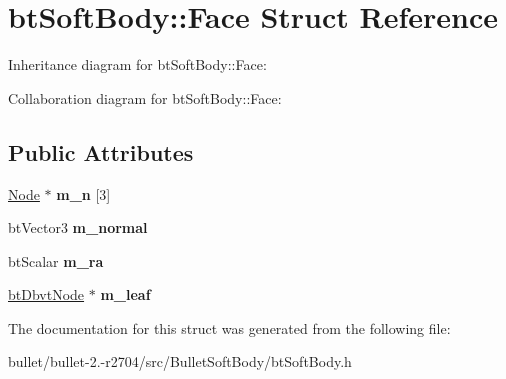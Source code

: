 \hypertarget{structbt_soft_body_1_1_face}{\section{bt\+Soft\+Body\+:\+:Face Struct Reference}
\label{structbt_soft_body_1_1_face}
}


Inheritance diagram for bt\+Soft\+Body\+:\+:Face\+:


Collaboration diagram for bt\+Soft\+Body\+:\+:Face\+:
\subsection*{Public Attributes}
\begin{DoxyCompactItemize}
\item 
\hypertarget{structbt_soft_body_1_1_face_adac49d4261998d2c4c3611c104ae0f8c}{\hyperlink{structbt_soft_body_1_1_node}{Node} $\ast$ {\bfseries m\+\_\+n} \mbox{[}3\mbox{]}}\label{structbt_soft_body_1_1_face_adac49d4261998d2c4c3611c104ae0f8c}

\item 
\hypertarget{structbt_soft_body_1_1_face_a715422a3e0a99f7dce614aec5c2baa58}{bt\+Vector3 {\bfseries m\+\_\+normal}}\label{structbt_soft_body_1_1_face_a715422a3e0a99f7dce614aec5c2baa58}

\item 
\hypertarget{structbt_soft_body_1_1_face_a644dbb11481a1f0a54a6b1b47e29cf0a}{bt\+Scalar {\bfseries m\+\_\+ra}}\label{structbt_soft_body_1_1_face_a644dbb11481a1f0a54a6b1b47e29cf0a}

\item 
\hypertarget{structbt_soft_body_1_1_face_ae0dce3a9981dc191dc4b0ff917239621}{\hyperlink{structbt_dbvt_node}{bt\+Dbvt\+Node} $\ast$ {\bfseries m\+\_\+leaf}}\label{structbt_soft_body_1_1_face_ae0dce3a9981dc191dc4b0ff917239621}

\end{DoxyCompactItemize}


The documentation for this struct was generated from the following file\+:\begin{DoxyCompactItemize}
\item 
bullet/bullet-\/2.-\/r2704/src/\+Bullet\+Soft\+Body/bt\+Soft\+Body.\+h\end{DoxyCompactItemize}
